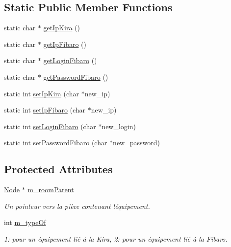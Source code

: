\subsection*{Static Public Member Functions}
\begin{DoxyCompactItemize}
\item 
static char $\ast$ \hyperlink{class_e_p_1_1_equipment_adaffca0c6347dae9c4a50e43964470d7}{get\+Ip\+Kira} ()
\item 
static char $\ast$ \hyperlink{class_e_p_1_1_equipment_a7deb5f2f0fd0298440fd57d6e2e6c07d}{get\+Ip\+Fibaro} ()
\item 
static char $\ast$ \hyperlink{class_e_p_1_1_equipment_a81a3c8902b762f36114f265de34a2f4c}{get\+Login\+Fibaro} ()
\item 
static char $\ast$ \hyperlink{class_e_p_1_1_equipment_abc89eb422fe65d3fd3cba0e0024902ff}{get\+Password\+Fibaro} ()
\item 
static int \hyperlink{class_e_p_1_1_equipment_ad7e1a1a1b42188a16233215a908deca0}{set\+Ip\+Kira} (char $\ast$new\+\_\+ip)
\item 
static int \hyperlink{class_e_p_1_1_equipment_ae947b329b91e6d9cb37b618acc34a2a7}{set\+Ip\+Fibaro} (char $\ast$new\+\_\+ip)
\item 
static int \hyperlink{class_e_p_1_1_equipment_ab2bf8dd407ef5b0d998918cd6ab6a8a3}{set\+Login\+Fibaro} (char $\ast$new\+\_\+login)
\item 
static int \hyperlink{class_e_p_1_1_equipment_ad1abd0762bc1f17283307e6a102f0daa}{set\+Password\+Fibaro} (char $\ast$new\+\_\+password)
\end{DoxyCompactItemize}
\subsection*{Protected Attributes}
\begin{DoxyCompactItemize}
\item 
\hyperlink{class_e_p_1_1_node}{Node} $\ast$ \hyperlink{class_e_p_1_1_equipment_a826ee59574194978cd3e02e8824a0a5a}{m\+\_\+room\+Parent}\hypertarget{class_e_p_1_1_equipment_a826ee59574194978cd3e02e8824a0a5a}{}\label{class_e_p_1_1_equipment_a826ee59574194978cd3e02e8824a0a5a}

\begin{DoxyCompactList}\small\item\em Un pointeur vers la pièce contenant l\textquotesingle{}équipement. \end{DoxyCompactList}\item 
int \hyperlink{class_e_p_1_1_equipment_abf8f83a01b6843ffc15cc8b77254dbe3}{m\+\_\+type\+Of}\hypertarget{class_e_p_1_1_equipment_abf8f83a01b6843ffc15cc8b77254dbe3}{}\label{class_e_p_1_1_equipment_abf8f83a01b6843ffc15cc8b77254dbe3}

\begin{DoxyCompactList}\small\item\em 1\+: pour un équipement lié à la Kira, 2\+: pour un équipement lié à la Fibaro. \end{DoxyCompactList}\end{DoxyCompactItemize}

